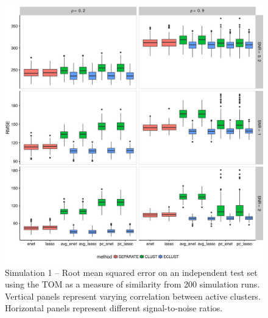 \begin{figure}[H]
	\centering
	\includegraphics[scale=0.6, keepaspectratio]{./figs/hydra/results/figures/sim1-sept10/RMSE_TOM_sim1.png}
	\caption{Simulation 1 -- Root mean squared error on an independent test set using the TOM as a measure of similarity from 200 simulation runs. Vertical panels represent varying correlation between active clusters. Horizontal panels represent different signal-to-noise ratios.}
	\label{fig:RMSE_TOM_sim1}
\end{figure}


